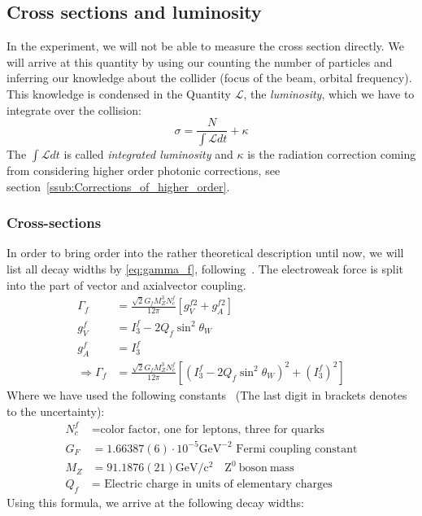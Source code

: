 \subsection{Cross sections and luminosity}
In the experiment, we will not be able to measure the cross section directly. We will arrive at this quantity by using our
counting the number of particles and inferring our knowledge about the collider (focus of the beam, orbital frequency). This
knowledge is condensed in the Quantity $\mathcal{L}$, the \textit{luminosity}, which we have to integrate over the collision:
\begin{equation}
    \sigma = \frac{N}{\int \mathcal{L} dt} + \kappa
\end{equation}
The $\int \mathcal{L} dt$ is called \textit{integrated luminosity} and $\kappa$ is the radiation correction coming from 
considering higher order photonic corrections, see section~\ref{ssub:Corrections_of_higher_order}.
\subsubsection{Cross-sections}
\label{sub:cross_sections}
In order to bring order into the rather theoretical description until now, we will list all decay widths by \eqref{eq:gamma_f},
following~\cite{ver}.
The electroweak force is split into the part of vector and axialvector coupling. 
\begin{align*}
    \Gamma_f &= \frac{\sqrt{2} G_f M_Z^3 N_c^f}{12 \pi} \left[ g_V^{f2} + g_A^{f2} \right] \\
       g_V^f &= I_3^f - 2 Q_f \sin^2 \theta_W \\
       g_A^f &= I_3^f \\
\Rightarrow \Gamma_f &= \frac{\sqrt{2} G_f M_Z^3 N_c^f}{12 \pi} \left[ (I_3^f - 2 Q_f \sin^2 \theta_W)^2 + (I_3^f)^2  \right] 
\end{align*}
Where we have used the following constants~\cite{pdg} (The last digit in brackets denotes to the uncertainty):
\begin{align*}
\label{eq:consts}
    N_c^f &= \text{color factor, one for leptons, three for quarks}  \\
    G_F &= 1.66387(6) \cdot 10^{-5} \mathrm{GeV^{-2}} \text{ Fermi coupling constant} \\
    M_Z &= 91.1876(21) \mathrm{GeV /c^{2}} \quad \mathrm{Z^0 \: boson \: mass} \\
    Q_f &= \text{ Electric charge in units of elementary charges}
\end{align*}
Using this formula, we arrive at the following decay widths:

